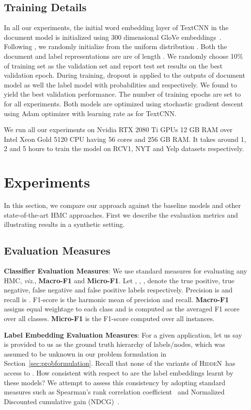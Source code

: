 \documentclass[11pt,a4paper]{article}
\newcommand{\model}{\mbox{\textsc{HiddeN}}}
\begin{document}
\subsection{Training Details}
In all our experiments, the initial word embedding layer of TextCNN in the document model is initialized using 300 dimensional GloVe embeddings~\citep{glove}. Following \citet{poincare}, we randomly initialize  from the uniform distribution . Both the document and label representations are are of length . We randomly choose 10\% of training set as the validation set and report test set results on the best validation epoch. During training, dropout is applied to the outputs of document model as well the label model with probabilities  and  respectively. We found  to yield the best validation performance. The number of training epochs are set to  for all experiments. Both models are optimized using stochastic gradient descent using Adam optimizer \citep{kingma2014adam} with learning rate as  for TextCNN.

We run all our experiments on Nvidia RTX 2080 Ti GPUs 12 GB RAM over Intel Xeon Gold 5120 CPU having 56 cores and 256 GB RAM. It takes around 1, 2 and 5 hours to train the model on RCV1, NYT and Yelp datasets respectively.

\section{Experiments}\label{sec:sim}
In this section, we compare our approach against the baseline models and other state-of-the-art HMC approaches. First we describe the evaluation metrics and illustrating results in a synthetic setting.

\subsection{Evaluation Measures}

\textbf{Classifier Evaluation Measures}: We use standard measures for evaluating any HMC, {\em viz.}, \textbf{Macro-F1} and \textbf{Micro-F1}. Let , , ,  denote the true positive, true negative, false negative and false positive labels respectively. Precision is  and recall is . F1-score is the harmonic mean of precision and recall. \textbf{Macro-F1} assigns equal weightage to each class and is computed as the averaged F1 score over all classes. \textbf{Micro-F1} is the F1-score computed over all instances.

\noindent \textbf{Label Embedding Evaluation Measures}:
For a given application, let us say  is provided to us as the ground truth hierarchy of labels/nodes, which was assumed to be unknown in our problem formulation in Section~\ref{sec:probformulation}. Recall that none of the variants of \model\ has access to . How consistent with respect to  are the label embeddings learnt by these models? We attempt to assess this consistency by adopting standard measures such as Spearman's rank correlation coefficient~\citep{zar2005spearman} and Normalized Discounted cumulative gain (NDCG)~\cite{dcg}. 
\end{document}
